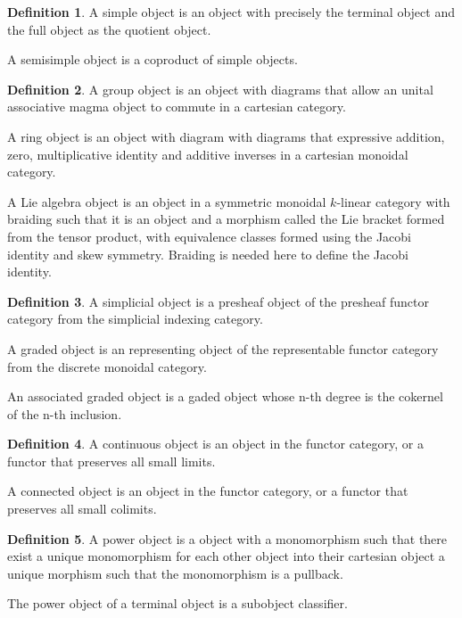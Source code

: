 \documentclass[10pt]{article}
\theoremstyle{plain}%
\theoremstyle{definition}
\newtheorem{definition}{Definition}[section]
\theoremstyle{remark}
\begin{document}
\begin{definition}
    A simple object is an object with precisely the terminal object and the full object as the quotient object.

    A semisimple object is a coproduct of simple objects.
\end{definition}

\begin{definition}
    A group object is an object with diagrams that allow an unital associative magma object to commute in a cartesian category.

    A ring object is an object with diagram with diagrams that expressive addition, zero, multiplicative identity and additive inverses in a cartesian monoidal category.

    A Lie algebra object is an object in a symmetric monoidal $k$-linear category with braiding such that it is an object and a morphism called the Lie bracket formed from the tensor product, with equivalence classes formed using the Jacobi identity and skew symmetry. Braiding is needed here to define the Jacobi identity.
\end{definition}

\begin{definition}
    A simplicial object is a presheaf object of the presheaf functor category from the simplicial indexing category.

    A graded object is an representing object of the representable functor category from the discrete monoidal category.

    An associated graded object is a gaded object whose n-th degree is the cokernel of the n-th inclusion.
\end{definition}

\begin{definition}
    A continuous object is an object in the functor category, or a functor that preserves all small limits.

    A connected object is an object in the functor category, or a functor that preserves all small colimits.
\end{definition}

\begin{definition}
    A power object is a object with a monomorphism such that there exist a unique monomorphism for each other object into their cartesian object a unique morphism such that the monomorphism is a pullback.

    The power object of a terminal object is a subobject classifier.
\end{definition}
\end{document}
